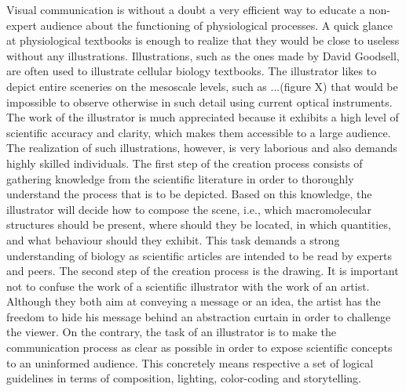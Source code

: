 Visual communication is without a doubt a very efficient way to educate a non-expert audience about the functioning of physiological processes.
A quick glance at physiological textbooks is enough to realize that they would be close to useless without any illustrations.
Illustrations, such as the ones made by David Goodsell, are often used to illustrate cellular biology textbooks.
The illustrator likes to depict entire sceneries on the mesoscale levels, such as ...(figure X) that would be impossible to observe otherwise in such detail using current optical instruments.
The work of the illustrator is much appreciated because it exhibits a high level of scientific accuracy and clarity, which makes them accessible to a large audience. 
The realization of such illustrations, however, is very laborious and also demands highly skilled individuals.
The first step of the creation process consists of gathering knowledge from the scientific literature in order to thoroughly understand the process that is to be depicted.
Based on this knowledge, the illustrator will decide how to compose the scene, i.e., which macromolecular structures should be present, where should they be located, in which quantities, and what behaviour should they exhibit.
This task demands a strong understanding of biology as scientific articles are intended to be read by experts and peers.
The second step of the creation process is the drawing. 
It is important not to confuse the work of a scientific illustrator with the work of an artist.
Although they both aim at conveying a message or an idea, the artist has the freedom to hide his message behind an abstraction curtain in order to challenge the viewer.
On the contrary, the task of an illustrator is to make the communication process as clear as possible in order to expose scientific concepts to an uninformed audience.
This concretely means respective a set of logical guidelines in terms of composition, lighting, color-coding and storytelling.

